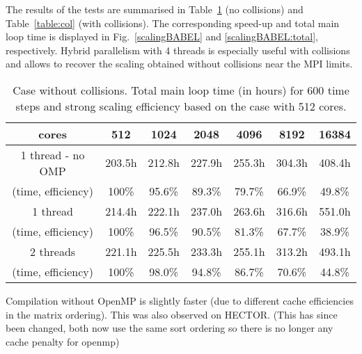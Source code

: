 The results of the tests are summarised in Table~\ref{table:nocol} (no collisions) and Table~\ref{table:col} (with collisions). The corresponding speed-up and total main loop time is displayed in Fig.~\ref{scalingBABEL} and \ref{scalingBABEL:total}, respectively. Hybrid parallelism with 4 threads is especially useful with collisions and allows to recover the scaling obtained without collisions near the MPI limits. 
\begin{table}
\begin{center}
\begin{tabular}{|c|c|c|c|c|c|c|}
\hline
cores & 512 & 1024 & 2048 & 4096 & 8192 & 16384\\
\hline
1 thread - no OMP& 203.5h & 212.8h & 227.9h& 255.3h & 304.3h & 408.4h \\
(time, efficiency) & 100\% & 95.6\%  & 89.3\%  & 79.7\%&66.9\% & 49.8\%\\
\hline
1 thread & 214.4h & 222.1h & 237.0h& 263.6h & 316.6h & 551.0h \\
(time, efficiency) & 100\% & 96.5\%  & 90.5\%  & 81.3\%& 67.7\% & 38.9\%\\
\hline
2 threads &221.1h & 225.5h & 233.3h& 255.1h & 313.2h & 493.1h \\
(time, efficiency) & 100\% & 98.0\%  & 94.8\%  & 86.7\% & 70.6\% & 44.8\%\\
\hline
\end{tabular}
\caption{Case without collisions. Total main loop time (in hours) for 600 time steps and strong scaling efficiency based on the case with 512 cores.}
\label{table:nocol}
\end{center}
\end{table}
Compilation without OpenMP is slightly faster (due to different cache efficiencies in the matrix ordering). This was also observed on HECTOR. (This has since been changed, both now use the same sort ordering so there is no longer any cache penalty for openmp)
